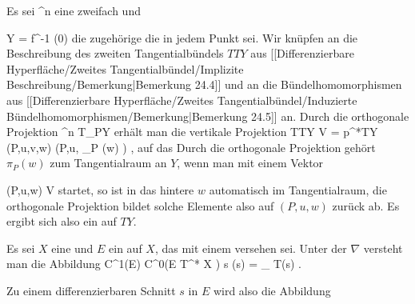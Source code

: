 {}
{

Es sei
 {\R^n } { \R
} {}
eine zweifach
und

\mavergleichskette
{\vergleichskette
{ Y
}
{ = }{ f^{-1} (0)
}
{  }{
}
{    }{
}
{   }{
}
}
{}{}{}
die zugehörige
die in jedem Punkt
sei. Wir knüpfen an die Beschreibung des zweiten Tangentialbündels $TTY$ aus
[[Differenzierbare Hyperfläche/Zweites Tangentialbündel/Implizite Beschreibung/Bemerkung|Bemerkung 24.4]]
und an die Bündelhomomorphismen aus
[[Differenzierbare Hyperfläche/Zweites Tangentialbündel/Induzierte Bündelhomomorphismen/Bemerkung|Bemerkung 24.5]]
an. Durch die orthogonale Projektion
\maabb {} {\R^n } { T_PY
} {}
erhält man die vertikale Projektion
\maabbeledisp {} {TTY} { V = p^*TY
} {(P,u,v,w)} { (P,u, \pi_P (w) )
} {,}
auf das
Durch die orthogonale Projektion gehört $\pi_P(w)$ zum Tangentialraum an $Y$, wenn man mit einem Vektor

\mavergleichskette
{\vergleichskette
{ (P,u,w)
}
{ \in }{ V
}
{  }{
}
{    }{
}
{   }{
}
}
{}{}{}
startet, so ist in
 das hintere $w$ automatisch im Tangentialraum, die orthogonale Projektion bildet solche Elemente also auf $(P,u,w)$ zurück ab. Es ergibt sich also ein
auf $TY$.

}


{}
{

Es sei $X$ eine
und $E$ ein
auf $X$, das mit einem
versehen sei. Unter der
$\nabla$ versteht man die Abbildung
\maabbeledisp {\nabla} {C^1(E)} { C^0(E \otimes T^* X )
} { s } { \nabla(s) = \pi_{ }  \circ T(s)
} {.}

}
Zu einem differenzierbaren Schnitt $s$ in $E$
 {} {}
wird also die Abbildung

 {  }

